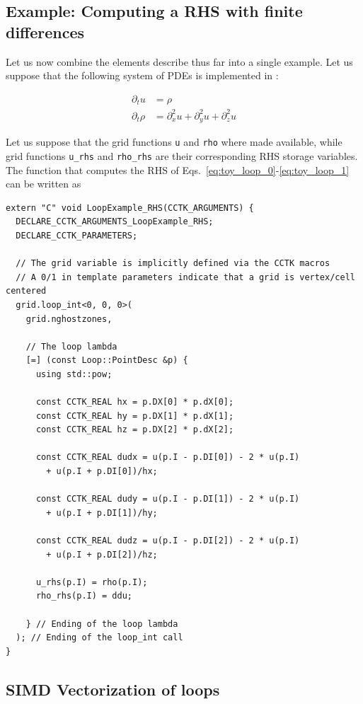 \subsection{Example: Computing a RHS with finite differences}

Let us now combine the elements describe thus far into a single example. Let us suppose that the following system of PDEs is implemented in \Cactus:

\begin{align}
  \partial_t u & = \rho \label{eq:toy_loop_0}\\
  \partial_t \rho & = \partial_x^2 u + \partial_y^2 u + \partial_z^2 u \label{eq:toy_loop_1}
\end{align}

Let us suppose that the grid functions \texttt{u} and \texttt{rho} where made available, while grid functions \texttt{u\_rhs} and \texttt{rho\_rhs} are their corresponding RHS storage variables. The function that computes the RHS of Eqs.~\eqref{eq:toy_loop_0}-\eqref{eq:toy_loop_1} can be written as

\begin{verbatim}
extern "C" void LoopExample_RHS(CCTK_ARGUMENTS) {
  DECLARE_CCTK_ARGUMENTS_LoopExample_RHS;
  DECLARE_CCTK_PARAMETERS;

  // The grid variable is implicitly defined via the CCTK macros
  // A 0/1 in template parameters indicate that a grid is vertex/cell centered
  grid.loop_int<0, 0, 0>(
    grid.nghostzones,

    // The loop lambda
    [=] (const Loop::PointDesc &p) {
      using std::pow;

      const CCTK_REAL hx = p.DX[0] * p.dX[0];
      const CCTK_REAL hy = p.DX[1] * p.dX[1];
      const CCTK_REAL hz = p.DX[2] * p.dX[2];
      
      const CCTK_REAL dudx = u(p.I - p.DI[0]) - 2 * u(p.I) 
        + u(p.I + p.DI[0])/hx;

      const CCTK_REAL dudy = u(p.I - p.DI[1]) - 2 * u(p.I) 
        + u(p.I + p.DI[1])/hy;

      const CCTK_REAL dudz = u(p.I - p.DI[2]) - 2 * u(p.I) 
        + u(p.I + p.DI[2])/hz;

      u_rhs(p.I) = rho(p.I);
      rho_rhs(p.I) = ddu;

    } // Ending of the loop lambda
  ); // Ending of the loop_int call
}
\end{verbatim}

\subsection{SIMD Vectorization of loops}

